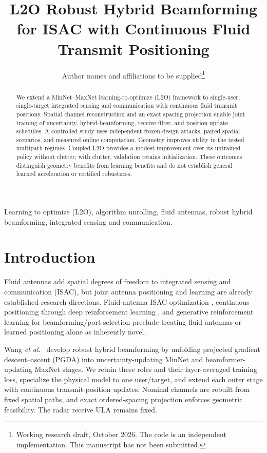 \documentclass[10pt,journal,onecolumn,draftclsnofoot]{IEEEtran}
\title{L2O Robust Hybrid Beamforming for ISAC with Continuous Fluid Transmit Positioning}
\author{Author names and affiliations to be supplied\thanks{Working research draft, October 2026. The code is an independent implementation. This manuscript has not been submitted.}}
\begin{document}
\maketitle
\begin{abstract}
We extend a MinNet--MaxNet learning-to-optimize (L2O) framework to single-user, single-target integrated sensing and communication with continuous fluid transmit positions. Spatial channel reconstruction and an exact spacing projection enable joint training of uncertainty, hybrid-beamforming, receive-filter, and position-update schedules. A controlled study uses independent frozen-design attacks, paired spatial scenarios, and measured online computation. Geometry improves utility in the tested multipath regimes. Coupled L2O provides a modest improvement over its untrained policy without clutter; with clutter, validation retains initialization. These outcomes distinguish geometry benefits from learning benefits and do not establish general learned acceleration or certified robustness.
\end{abstract}
\begin{IEEEkeywords}
Learning to optimize (L2O), algorithm unrolling, fluid antennas, robust hybrid beamforming, integrated sensing and communication.
\end{IEEEkeywords}

\section{Introduction}
Fluid antennas add spatial degrees of freedom to integrated sensing and communication (ISAC), but joint antenna positioning and learning are already established research directions. Fluid-antenna ISAC optimization \cite{zhou}, continuous positioning through deep reinforcement learning \cite{yang}, and generative reinforcement learning for beamforming/port selection \cite{zhang} preclude treating fluid antennas or learned positioning alone as inherently novel.

Wang \emph{et al.}~\cite{wang} develop robust hybrid beamforming by unfolding projected gradient descent--ascent (PGDA) into uncertainty-updating MinNet and beamformer-updating MaxNet stages. We retain these roles and their layer-averaged training loss, specialize the physical model to one user/target, and extend each outer stage with continuous transmit-position updates. Nominal channels are rebuilt from fixed spatial paths, and exact ordered-spacing projection enforces geometric feasibility. The radar receive ULA remains fixed.
\end{document}
